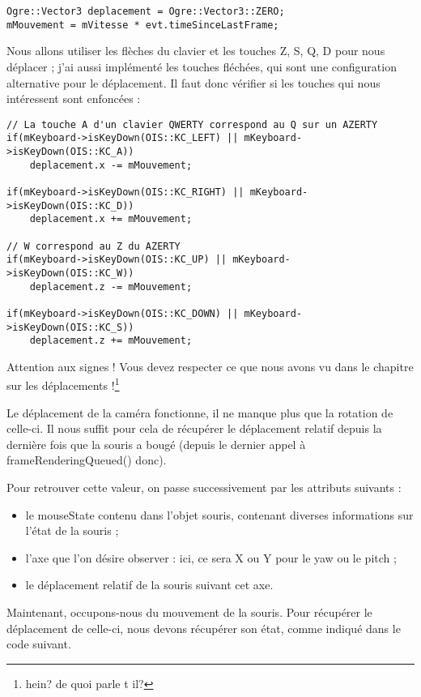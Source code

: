 \documentclass[10pt,a4paper]{report}
\begin{document}
\begin{lstlisting}[caption={}]
Ogre::Vector3 deplacement = Ogre::Vector3::ZERO;
mMouvement = mVitesse * evt.timeSinceLastFrame;
\end{lstlisting}

Nous allons utiliser les fl\`eches du clavier et les touches Z, S, Q, D pour nous d\'eplacer ; j'ai aussi impl\'ement\'e les touches fl\'ech\'ees, qui sont une configuration alternative pour le d\'eplacement. Il faut donc v\'erifier si les touches qui nous int\'eressent sont enfonc\'ees :


\begin{lstlisting}[caption={}]
// La touche A d'un clavier QWERTY correspond au Q sur un AZERTY
if(mKeyboard->isKeyDown(OIS::KC_LEFT) || mKeyboard->isKeyDown(OIS::KC_A)) 
    deplacement.x -= mMouvement;

if(mKeyboard->isKeyDown(OIS::KC_RIGHT) || mKeyboard->isKeyDown(OIS::KC_D))
    deplacement.x += mMouvement;
    
// W correspond au Z du AZERTY
if(mKeyboard->isKeyDown(OIS::KC_UP) || mKeyboard->isKeyDown(OIS::KC_W)) 
    deplacement.z -= mMouvement;

if(mKeyboard->isKeyDown(OIS::KC_DOWN) || mKeyboard->isKeyDown(OIS::KC_S))
    deplacement.z += mMouvement;
\end{lstlisting}

Attention aux signes ! Vous devez respecter ce que nous avons vu dans le chapitre sur les d\'eplacements !\footnote{hein? de quoi parle t il?}

Le d\'eplacement de la cam\'era fonctionne, il ne manque plus que la rotation de celle-ci. Il nous suffit pour cela de r\'ecup\'erer le d\'eplacement relatif depuis la derni\`ere fois que la souris a boug\'e (depuis le dernier appel \`a frameRenderingQueued() donc).

Pour retrouver cette valeur, on passe successivement par les attributs suivants :
\begin{itemize}
\item le mouseState contenu dans l'objet souris, contenant diverses informations sur l'\'etat de la souris ;
\item l'axe que l'on d\'esire observer : ici, ce sera X ou Y pour le yaw ou le pitch ;
\item le d\'eplacement relatif de la souris suivant cet axe.
\end{itemize}

Maintenant, occupons-nous du mouvement de la souris. Pour r\'ecup\'erer le d\'eplacement de celle-ci, nous devons r\'ecup\'erer son \'etat, comme indiqu\'e dans le code suivant.
\end{document}
